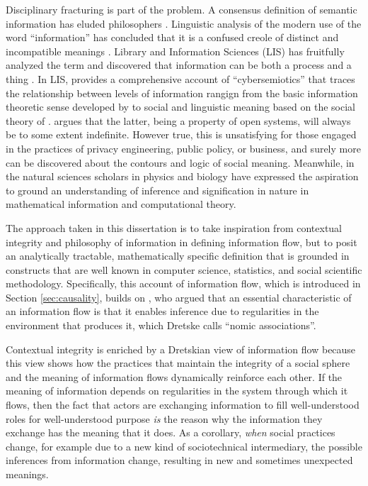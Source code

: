 \documentclass[../thesis.tex]{subfiles}
\begin{document}
 Disciplinary fracturing is part of the problem.
 A consensus definition of semantic information has eluded
 philosophers \citep{sep-information-semantic}.
 Linguistic analysis of the modern use of the word ``information''
 has concluded that it is a confused creole of distinct and
 incompatible meanings \citep{nunberg1996farewell}.
 Library and Information Sciences (LIS) has fruitfully analyzed the
 term and discovered that information can be both a process
 and a thing \cite{buckland1991information}. In LIS,
 \citet{brier2008cybersemiotics} provides a comprehensive account
 of ``cybersemiotics'' that traces the relationship between
 levels of information rangign from the basic information theoretic
 sense developed by \citet{shannon1948mathematical} to
 social and linguistic meaning based on the social theory of
 \citet{luhmann1995social}.
 \citet{brier2008cybersemiotics} argues that the latter, being
 a property of open systems, will always be to some extent
 indefinite.
 However true, this is unsatisfying for those engaged in
 the practices of privacy engineering, public policy, or
 business, and surely more can be discovered about the
 contours and logic of social meaning.
 Meanwhile, in the natural sciences scholars in physics
 \citep{wolpert2008physical} and biology \citep{deacon2015steps}
 have expressed the aspiration to ground an understanding of
 inference and signification in nature in mathematical information
 and computational theory.
 
 The approach taken in this dissertation is to take inspiration
 from contextual integrity and philosophy of information
 in defining information flow, but
 to posit an analytically tractable, mathematically specific
 definition that is grounded in constructs that are well known
 in computer science, statistics, and social scientific methodology.
 Specifically, this account of information flow, which is introduced
 in Section \ref{sec:causality},
 builds on \citet{dretske1981knowledge}, who argued that an
 essential characteristic of an information flow is that
 it enables inference due to regularities in the environment
 that produces it, which Dretske calls ``nomic associations''.

 Contextual integrity is enriched by a Dretskian view of
 information flow because this view shows how the practices
 that maintain the integrity of a social sphere and the
 meaning of information flows dynamically reinforce each
 other.
 If the meaning of information depends on regularities in
 the system through which it flows, then the fact that
 actors are exchanging information to fill well-understood
 roles for well-understood purpose \textit{is} the reason why
 the information they exchange has the meaning that it does.
 As a corollary, \textit{when} social practices change, for
 example due to a new kind of sociotechnical intermediary,
 the possible inferences from information change, resulting
 in new and sometimes unexpected meanings.
\end{document}
